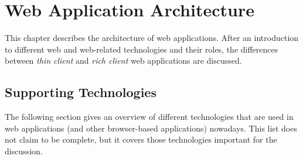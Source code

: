 \chapter{Web Application Architecture}
\label{chap:webapparch}
This chapter describes the architecture of web applications. After an introduction to different web and web-related technologies and their roles, the differences between \emph{thin client} and \emph{rich client} web applications are discussed.
\section{Supporting Technologies}
The following section gives an overview of different technologies that are used in web applications (and other browser-based applications) nowadays. This list does not claim to be complete, but it covers those technologies important for the discussion.
